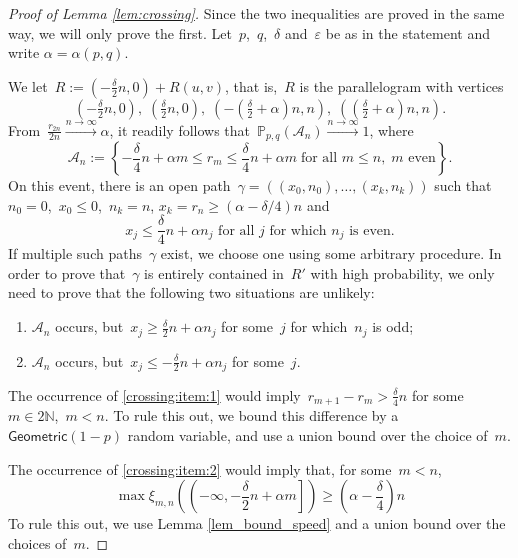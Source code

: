 \documentclass[pdflatex,sn-mathphys-num]{sn-jnl}%
\newcommand{\bbN}{{\ensuremath{\mathbb N}} }
\newcommand{\bbP}{{\ensuremath{\mathbb P}} }
\newcommand{\1}{{\ensuremath{\mathbf{1}}} }
\theoremstyle{thmstyleone}%
\theoremstyle{thmstyletwo}%
\theoremstyle{thmstylethree}%
\begin{document}
\begin{proof}[Proof of Lemma \ref{lem:crossing}]
	Since the two inequalities are proved in the same way, we will only prove the first. Let~$p$,~$q$,~$\delta$ and~$\varepsilon$ be as in the statement {and write $\alpha=\alpha(p,q)$}.


We let~${R} := (-\tfrac{\delta}{2}n,0) + R(u,v) $, that is,~${R}$ is the parallelogram with vertices
\[(-\tfrac{\delta}{2}n,0),\;(\tfrac{\delta}{2}n,0),\;(-(\tfrac{\delta}{2}+\alpha)n,n),\;((\tfrac{\delta}{2}+\alpha)n,n).\] 
From~$\frac{r_{2n}}{2n} \xrightarrow{n \to \infty} \alpha$, it readily follows that~$\bbP_{p,q}(\mathcal A_n) \xrightarrow{n \to \infty}1$, where
\[\mathcal A_n := \left\{-\frac{\delta}{4}n + \alpha m \le r_m \le \frac{\delta}{4}n + \alpha m \; \text{for all } m\le n,\; m \text{ even} \right\}.\]
On this event, there is a{n open} path~$\gamma = ((x_0,n_0),\ldots,(x_k,n_k))$ such that~$n_0 = 0$,~$x_0 \le 0$,~$n_k = n$, $x_k=r_n\ge (\alpha-\delta/4) n$ and
\[ x_j {\le} \frac{\delta}{4}n + \alpha n_j \text{ for all $j$ for which $n_j$ is even}.\]
If multiple such paths~$\gamma$ exist, we choose one using some arbitrary procedure. In order to prove that~$\gamma$ is entirely contained in~$R'$ with high probability, we only need to prove that the following two situations are unlikely:
\begin{enumerate}
    \item\label{crossing:item:1} $\mathcal A_n$ occurs, but~$x_j \ge \frac{\delta}{2}n + \alpha n_j$ for some~$j$ for which~$n_j$ is odd;
    \item\label{crossing:item:2} $\mathcal A_n$ occurs, but~$x_j \le -\frac{\delta}{2}n + \alpha n_j$ for some~$j$.
\end{enumerate}

The occurrence of \ref{crossing:item:1} would imply~$r_{m+1} - r_m > \frac{\delta}{4}n$ for some~$m \in 2 \bbN$,~$m < n$. To rule this out, we bound this difference by a~$\mathsf{Geometric}(1-p)$ random variable, and use a union bound over the choice of~$m$.

The occurrence of \ref{crossing:item:2} would imply that, for some~$m < n$,
\[\max\xi_{m,n}\left(\left(-\infty,-\frac\delta2n+\alpha m\right]\right)\ge \left(\alpha-\frac\delta4\right)n\]
To rule this out, we use Lemma \ref{lem_bound_speed} and a union bound over the choices of~$m$.	
\end{proof}
\end{document}
